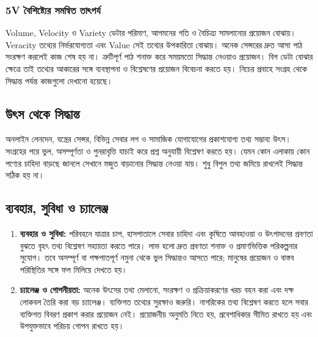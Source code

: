 \subsubsection{5V বৈশিষ্ট্যের সমন্বিত তাৎপর্য}
Volume, Velocity ও Variety ডেটার পরিমাণ, আগমনের গতি ও বৈচিত্র্য সামলানোর প্রয়োজন বোঝায়। Veracity তথ্যের নির্ভরযোগ্যতা এবং Value সেই তথ্যের উপকারিতা বোঝায়। অনেক সেন্সরের দ্রুত আসা পাঠ সংরক্ষণ করলেই কাজ শেষ হয় না। ত্রুটিপূর্ণ পাঠ শনাক্ত করে সময়মতো সিদ্ধান্ত নেওয়াও প্রয়োজন। বিগ ডেটা বোঝার ক্ষেত্রে তাই তথ্যের আকারের সঙ্গে ব্যবস্থাপনা ও বিশ্লেষণের প্রয়োজন বিবেচনা করতে হয়। নিচের প্রবাহে সংগ্রহ থেকে সিদ্ধান্ত পর্যন্ত কাজগুলো দেখানো হয়েছে।


\subsection{উৎস থেকে সিদ্ধান্ত}
\begin{flushleft}
\end{flushleft}
অনলাইন লেনদেন, যন্ত্রের সেন্সর, বিভিন্ন সেবার লগ ও সামাজিক যোগাযোগের প্রকাশযোগ্য তথ্য সম্ভাব্য উৎস। সংগ্রহের পরে ভুল, অসম্পূর্ণতা ও পুনরাবৃত্তি যাচাই করে প্রশ্ন অনুযায়ী বিশ্লেষণ করতে হয়। যেমন কোন এলাকায় কোন পণ্যের চাহিদা বাড়ছে জানলে সেখানে মজুত বাড়ানোর সিদ্ধান্ত নেওয়া যায়। শুধু বিপুল তথ্য জমিয়ে রাখলেই সিদ্ধান্ত সঠিক হয় না।

\subsection{ব্যবহার, সুবিধা ও চ্যালেঞ্জ}
\begin{enumerate}
\item \textbf{ব্যবহার ও সুবিধা:} পরিবহনে যাত্রার চাপ, হাসপাতালে সেবার চাহিদা এবং কৃষিতে আবহাওয়া ও উৎপাদনের প্রবণতা বুঝতে বৃহৎ তথ্য বিশ্লেষণ সহায়তা করতে পারে। লাভ হলো দ্রুত প্রবণতা শনাক্ত ও প্রমাণভিত্তিক পরিকল্পনার সুযোগ। তবে অসম্পূর্ণ বা পক্ষপাতপূর্ণ নমুনা থেকে ভুল সিদ্ধান্তও আসতে পারে; মানুষের প্রয়োজন ও বাস্তব পরিস্থিতির সঙ্গে ফল মিলিয়ে দেখতে হয়।
\item \textbf{চ্যালেঞ্জ ও গোপনীয়তা:} অনেক উৎসের তথ্য মেলানো, সংরক্ষণ ও প্রক্রিয়াকরণের খরচ বহন করা এবং দক্ষ লোকবল তৈরি করা বড় চ্যালেঞ্জ। ব্যক্তিগত তথ্যের সুরক্ষাও জরুরি। নাগরিকের তথ্য বিশ্লেষণ করতে হলে সবার ব্যক্তিগত বিবরণ প্রকাশ করার প্রয়োজন নেই। প্রয়োজনীয় অনুমতি নিতে হয়, প্রবেশাধিকার সীমিত রাখতে হয় এবং উপযুক্তভাবে পরিচয় গোপন রাখতে হয়।
\end{enumerate}

